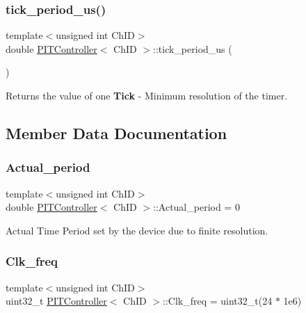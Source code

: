 \subsubsection{\texorpdfstring{tick\+\_\+period\+\_\+us()}{tick\_period\_us()}}
{\footnotesize\ttfamily template$<$unsigned int Ch\+ID$>$ \\
double \hyperlink{classPITController}{P\+I\+T\+Controller}$<$ Ch\+ID $>$\+::tick\+\_\+period\+\_\+us (\begin{DoxyParamCaption}{ }\end{DoxyParamCaption})\hspace{0.3cm}{\ttfamily [inline]}}



Returns the value of one {\bfseries Tick} -\/ Minimum resolution of the timer. 



\subsection{Member Data Documentation}
\mbox{\label{classPITController_a549601e7c66941d7872a6e7d38ed9563}} 
\subsubsection{\texorpdfstring{Actual\+\_\+period}{Actual\_period}}
{\footnotesize\ttfamily template$<$unsigned int Ch\+ID$>$ \\
double \hyperlink{classPITController}{P\+I\+T\+Controller}$<$ Ch\+ID $>$\+::Actual\+\_\+period = 0}



Actual Time Period set by the device due to finite resolution. 

\mbox{\label{classPITController_ae3d74bb18e5b22769e895f592cb16129}} 
\subsubsection{\texorpdfstring{Clk\+\_\+freq}{Clk\_freq}}
{\footnotesize\ttfamily template$<$unsigned int Ch\+ID$>$ \\
uint32\+\_\+t \hyperlink{classPITController}{P\+I\+T\+Controller}$<$ Ch\+ID $>$\+::Clk\+\_\+freq = uint32\+\_\+t(24 $\ast$ 1e6)}



